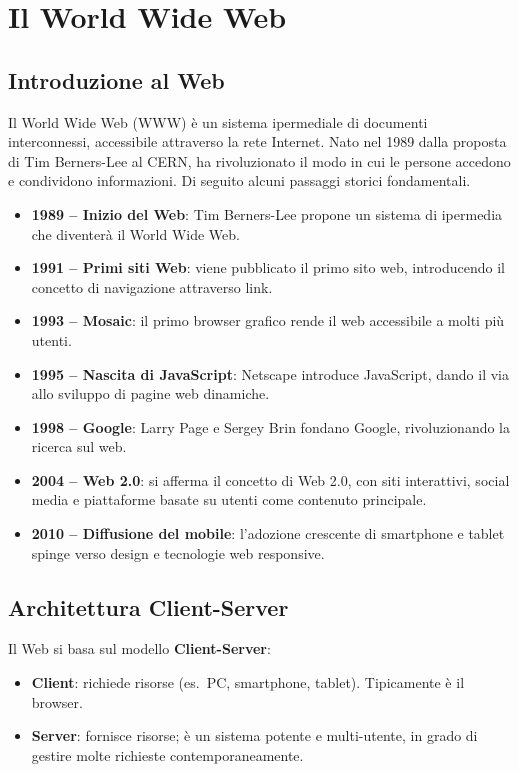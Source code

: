 \chapter{Il World Wide Web}

\section{Introduzione al Web}

Il World Wide Web (WWW) è un sistema ipermediale di documenti interconnessi, accessibile attraverso la rete Internet. Nato nel 1989 dalla proposta di Tim Berners-Lee al CERN, ha rivoluzionato il modo in cui le persone accedono e condividono informazioni. Di seguito alcuni passaggi storici fondamentali.

\begin{itemize}
    \item \textbf{1989 -- Inizio del Web}: Tim Berners-Lee propone un sistema di ipermedia che diventerà il World Wide Web.
    \item \textbf{1991 -- Primi siti Web}: viene pubblicato il primo sito web, introducendo il concetto di navigazione attraverso link.
    \item \textbf{1993 -- Mosaic}: il primo browser grafico rende il web accessibile a molti più utenti.
    \item \textbf{1995 -- Nascita di JavaScript}: Netscape introduce JavaScript, dando il via allo sviluppo di pagine web dinamiche.
    \item \textbf{1998 -- Google}: Larry Page e Sergey Brin fondano Google, rivoluzionando la ricerca sul web.
    \item \textbf{2004 -- Web 2.0}: si afferma il concetto di Web 2.0, con siti interattivi, social media e piattaforme basate su utenti come contenuto principale.
    \item \textbf{2010 -- Diffusione del mobile}: l'adozione crescente di smartphone e tablet spinge verso design e tecnologie web responsive.
\end{itemize}

\section{Architettura Client-Server}

Il Web si basa sul modello \textbf{Client-Server}:

\begin{itemize}
    \item \textbf{Client}: richiede risorse (es.\ PC, smartphone, tablet). Tipicamente è il browser.
    \item \textbf{Server}: fornisce risorse; è un sistema potente e multi-utente, in grado di gestire molte richieste contemporaneamente.
\end{itemize}

